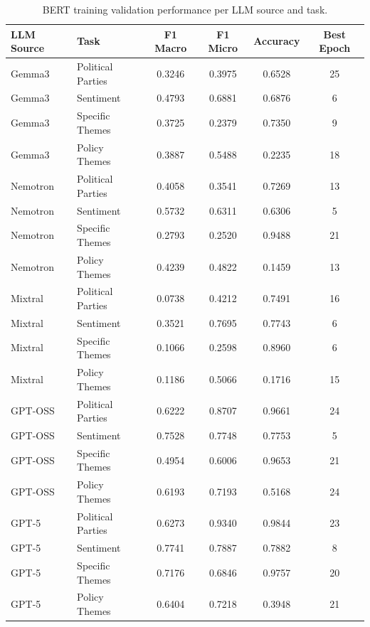 \begin{table}[h!]
\centering
\caption{BERT training validation performance per LLM source and task.}
\label{tab:training_metrics}
\begin{tabular}{llcccc}
\toprule
\textbf{LLM Source} & \textbf{Task} & \textbf{F1 Macro} & \textbf{F1 Micro} & \textbf{Accuracy} & \textbf{Best Epoch} \\
\midrule
Gemma3 & Political Parties & 0.3246 & 0.3975 & 0.6528 & 25 \\
Gemma3 & Sentiment & 0.4793 & 0.6881 & 0.6876 & 6 \\
Gemma3 & Specific Themes & 0.3725 & 0.2379 & 0.7350 & 9 \\
Gemma3 & Policy Themes & 0.3887 & 0.5488 & 0.2235 & 18 \\
\midrule
Nemotron & Political Parties & 0.4058 & 0.3541 & 0.7269 & 13 \\
Nemotron & Sentiment & 0.5732 & 0.6311 & 0.6306 & 5 \\
Nemotron & Specific Themes & 0.2793 & 0.2520 & 0.9488 & 21 \\
Nemotron & Policy Themes & 0.4239 & 0.4822 & 0.1459 & 13 \\
\midrule
Mixtral & Political Parties & 0.0738 & 0.4212 & 0.7491 & 16 \\
Mixtral & Sentiment & 0.3521 & 0.7695 & 0.7743 & 6 \\
Mixtral & Specific Themes & 0.1066 & 0.2598 & 0.8960 & 6 \\
Mixtral & Policy Themes & 0.1186 & 0.5066 & 0.1716 & 15 \\
\midrule
GPT-OSS & Political Parties & 0.6222 & 0.8707 & 0.9661 & 24 \\
GPT-OSS & Sentiment & 0.7528 & 0.7748 & 0.7753 & 5 \\
GPT-OSS & Specific Themes & 0.4954 & 0.6006 & 0.9653 & 21 \\
GPT-OSS & Policy Themes & 0.6193 & 0.7193 & 0.5168 & 24 \\
\midrule
GPT-5 & Political Parties & 0.6273 & 0.9340 & 0.9844 & 23 \\
GPT-5 & Sentiment & 0.7741 & 0.7887 & 0.7882 & 8 \\
GPT-5 & Specific Themes & 0.7176 & 0.6846 & 0.9757 & 20 \\
GPT-5 & Policy Themes & 0.6404 & 0.7218 & 0.3948 & 21 \\
\bottomrule
\end{tabular}
\end{table}